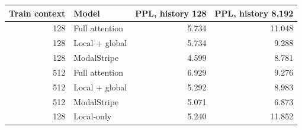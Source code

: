 \begin{tabular}{rlrr}\toprule
Train context & Model & PPL, history 128 & PPL, history 8,192\\\midrule
128 & Full attention & 5.734 & 11.048 \\
128 & Local + global & 5.734 & 9.288 \\
128 & ModalStripe & 4.599 & 8.781 \\
512 & Full attention & 6.929 & 9.276 \\
512 & Local + global & 5.292 & 8.983 \\
512 & ModalStripe & 5.071 & 6.873 \\
128 & Local-only & 5.240 & 11.852 \\
\bottomrule\end{tabular}
